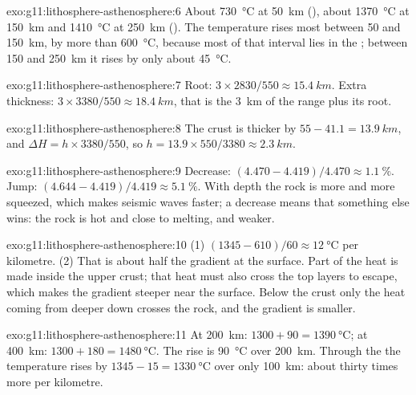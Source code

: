 \begin{solution}{exo:g11:lithosphere-asthenosphere:6}
About \qty{730}{\celsius} at \qty{50}{km} (), about
\qty{1370}{\celsius} at \qty{150}{km} and \qty{1410}{\celsius} at
\qty{250}{km} (). The temperature rises most between 50 and
\qty{150}{km}, by more than \qty{600}{\celsius}, because most of that
interval lies in the ; between 150 and \qty{250}{km} it rises by
only about \qty{45}{\celsius}.
\end{solution}

\begin{solution}{exo:g11:lithosphere-asthenosphere:7}
Root: $3 \times 2830/550 \approx \qty{15.4}{km}$. Extra thickness:
$3 \times 3380/550 \approx \qty{18.4}{km}$, that is the \qty{3}{km} of the
range plus its root.
\end{solution}

\begin{solution}{exo:g11:lithosphere-asthenosphere:8}
The crust is thicker by $55 - 41.1 = \qty{13.9}{km}$, and $\Delta H = h
\times 3380/550$, so $h = 13.9 \times 550/3380 \approx \qty{2.3}{km}$.
\end{solution}

\begin{solution}{exo:g11:lithosphere-asthenosphere:9}
Decrease: $(4.470 - 4.419)/4.470 \approx \qty{1.1}{\percent}$. Jump:
$(4.644 - 4.419)/4.419 \approx \qty{5.1}{\percent}$. With depth the rock is
more and more squeezed, which makes seismic waves faster; a decrease means
that something else wins: the rock is hot and close to melting, and weaker.
\end{solution}

\begin{solution}{exo:g11:lithosphere-asthenosphere:10}
(1) $(1345 - 610)/60 \approx \qty{12}{\celsius}$ per kilometre. (2) That is
about half the gradient at the surface. Part of the heat is made inside the
upper crust; that heat must also cross the top layers to escape, which makes
the gradient steeper near the surface. Below the crust only the heat coming
from deeper down crosses the rock, and the gradient is smaller.
\end{solution}

\begin{solution}{exo:g11:lithosphere-asthenosphere:11}
At \qty{200}{km}: $1300 + 90 = \qty{1390}{\celsius}$; at \qty{400}{km}:
$1300 + 180 = \qty{1480}{\celsius}$. The rise is \qty{90}{\celsius} over
\qty{200}{km}. Through the  the temperature rises by
$1345 - 15 = \qty{1330}{\celsius}$ over only \qty{100}{km}: about thirty
times more per kilometre.
\end{solution}


